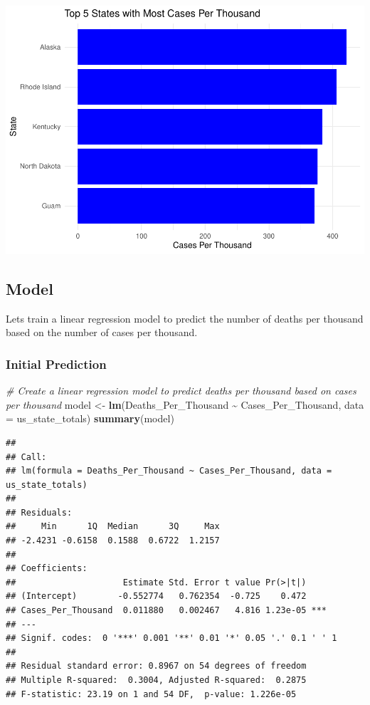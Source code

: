 \documentclass[
]{article}
\newenvironment{Shaded}{\begin{snugshade}}{\end{snugshade}}
\newcommand{\AttributeTok}[1]{\textcolor[rgb]{0.13,0.29,0.53}{#1}}
\newcommand{\CommentTok}[1]{\textcolor[rgb]{0.56,0.35,0.01}{\textit{#1}}}
\newcommand{\FunctionTok}[1]{\textcolor[rgb]{0.13,0.29,0.53}{\textbf{#1}}}
\newcommand{\NormalTok}[1]{#1}
\newcommand{\OtherTok}[1]{\textcolor[rgb]{0.56,0.35,0.01}{#1}}
\newcommand{\SpecialCharTok}[1]{\textcolor[rgb]{0.81,0.36,0.00}{\textbf{#1}}}
\begin{document}
\includegraphics{covid-data-analysis_files/figure-latex/us-per-thousand-2.pdf}

\subsection{Model}\label{model}

Lets train a linear regression model to predict the number of deaths per
thousand based on the number of cases per thousand.

\subsubsection{Initial Prediction}\label{initial-prediction}

\begin{Shaded}
\begin{Highlighting}[]
\CommentTok{\# Create a linear regression model to predict deaths per thousand based on cases per thousand}
\NormalTok{model }\OtherTok{\textless{}{-}} \FunctionTok{lm}\NormalTok{(Deaths\_Per\_Thousand }\SpecialCharTok{\textasciitilde{}}\NormalTok{ Cases\_Per\_Thousand, }\AttributeTok{data =}\NormalTok{ us\_state\_totals)}
\FunctionTok{summary}\NormalTok{(model)}
\end{Highlighting}
\end{Shaded}

\begin{verbatim}
## 
## Call:
## lm(formula = Deaths_Per_Thousand ~ Cases_Per_Thousand, data = us_state_totals)
## 
## Residuals:
##     Min      1Q  Median      3Q     Max 
## -2.4231 -0.6158  0.1588  0.6722  1.2157 
## 
## Coefficients:
##                     Estimate Std. Error t value Pr(>|t|)    
## (Intercept)        -0.552774   0.762354  -0.725    0.472    
## Cases_Per_Thousand  0.011880   0.002467   4.816 1.23e-05 ***
## ---
## Signif. codes:  0 '***' 0.001 '**' 0.01 '*' 0.05 '.' 0.1 ' ' 1
## 
## Residual standard error: 0.8967 on 54 degrees of freedom
## Multiple R-squared:  0.3004, Adjusted R-squared:  0.2875 
## F-statistic: 23.19 on 1 and 54 DF,  p-value: 1.226e-05
\end{verbatim}
\end{document}
